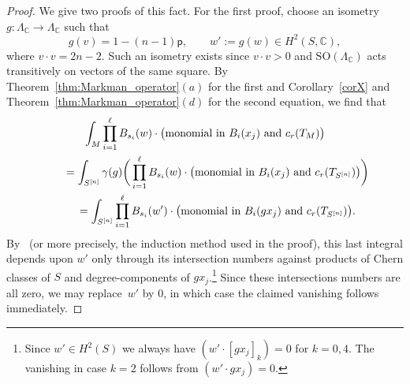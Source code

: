\documentclass[pdftex]{sigma}
\numberwithin{equation}{section}
\newcommand{\BC}{{\mathbb{C}}}
\newcommand{\pt}{{\mathsf{p}}}
\newcommand{\1}{\mathsf{1}}
\newcommand{\SO}{\mathrm{SO}}
\begin{document}
\begin{proof}
We give two proofs of this fact.
For the first proof, choose an isometry $g \colon \Lambda_{\BC} \to \Lambda_{\BC}$ such that
\[
g(v) = 1- (n-1) \pt, \qquad
w' := g(w) \in H^2(S,\BC) ,
\]
where $v \cdot v = 2n-2$. Such an isometry exists since $v \cdot v > 0$ and $\SO(\Lambda_{\BC})$ acts transitively on vectors of the same square.
By Theorem~\ref{thm:Markman_operator}$(a)$ for the first and Corollary~\ref{corX} and Theorem~\ref{thm:Markman_operator}$(d)$ for the second equation, we find that
\begin{gather*}
\int_{M} \prod_{i=1}^{\ell} B_{s_i}(w) \cdot \big(\textup{monomial in } B_i(x_j) \textup{ and } c_r(T_M)\big)
\\ \qquad
{}=\int_{S^{[n]}} \gamma(g)\bigg(\prod_{i=1}^{\ell} B_{s_i}(w) \cdot \big(\textup{monomial in } B_i(x_j) \textup{ and } c_r(T_{S^{[n]}}) \big) \bigg)
\\ \qquad
{}=\int_{S^{[n]}} \prod_{i=1}^{\ell} B_{s_i}(w') \cdot \big(\textup{monomial in } B_i(gx_j) \textup{ and } c_r(T_{S^{[n]}})\big).
\end{gather*}
By~\cite[Theorem 4.1]{EGL} (or more precisely, the induction method used in the proof),
this last integral depends upon $w'$ only through its intersection numbers against products of Chern classes of $S$ and degree-components of $g x_j$.\footnote{Since $w' \in H^2(S)$ we always have
$(w' \cdot [g x_j]_{k} ) = 0$ for $k=0,4$.
The vanishing in case $k=2$ follows from $(w' \cdot gx_j) = 0$.}
Since these intersections numbers are all zero, we may replace~$w'$ by $0$, in which case the claimed vanishing follows immediately.
\end{proof}
\end{document}
